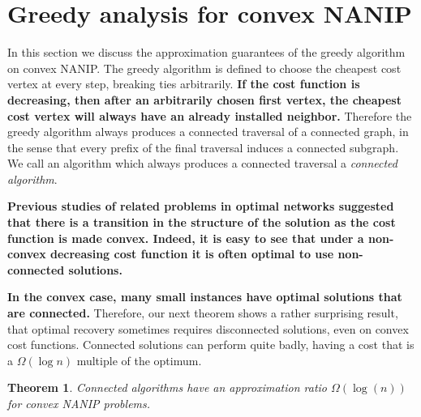 \documentclass[english]{llncs}
\newtheorem{thm}{Theorem}
\newcommand{\chg}[1]{\textbf{\color{red} #1}}
\begin{document}
\section{Greedy analysis for convex NANIP}

In this section we discuss the approximation guarantees of the greedy algorithm
on convex NANIP. The greedy algorithm is defined to choose the
cheapest cost vertex at every step, breaking ties arbitrarily.
\chg{If the cost function is decreasing, then after an arbitrarily chosen first vertex,
the cheapest cost vertex will always have an already installed neighbor.}
Therefore the greedy algorithm always produces a connected
traversal of a connected graph, in the sense that every prefix of the final
traversal induces a connected subgraph. We call an algorithm which always produces a
connected traversal a \emph{connected algorithm}.

\chg{Previous studies of related problems in optimal networks suggested that there is a transition 
in the structure of the solution as the cost function is made convex.  
Indeed, it is easy to see that under a non-convex decreasing cost function
it is often optimal to use non-connected solutions.}

\chg{In the convex case, many small instances have optimal solutions that are connected.}
Therefore, our next theorem shows a rather surprising result, that optimal recovery
sometimes requires disconnected solutions, even on convex cost functions.
Connected solutions can perform quite badly, having a cost that is a
$\Omega(\log n)$ multiple of the optimum.

\begin{thm}
Connected algorithms have an approximation ratio $\Omega(\log(n))$ for convex
NANIP problems.
\end{thm}
\end{document}
